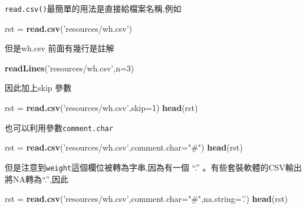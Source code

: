 \documentclass[]{book}
\newenvironment{Shaded}{\begin{snugshade}}{\end{snugshade}}
\newcommand{\DataTypeTok}[1]{\textcolor[rgb]{0.13,0.29,0.53}{#1}}
\newcommand{\DecValTok}[1]{\textcolor[rgb]{0.00,0.00,0.81}{#1}}
\newcommand{\KeywordTok}[1]{\textcolor[rgb]{0.13,0.29,0.53}{\textbf{#1}}}
\newcommand{\NormalTok}[1]{#1}
\newcommand{\StringTok}[1]{\textcolor[rgb]{0.31,0.60,0.02}{#1}}
\theoremstyle{definition}
\theoremstyle{definition}
\theoremstyle{definition}
\theoremstyle{remark}
\begin{document}
\texttt{read.csv()}最簡單的用法是直接給檔案名稱,例如

\begin{Shaded}
\begin{Highlighting}[]
\NormalTok{rst =}\StringTok{ }\KeywordTok{read.csv}\NormalTok{(}\StringTok{'resources/wh.csv'}\NormalTok{)}
\end{Highlighting}
\end{Shaded}

但是wh.csv 前面有幾行是註解

\begin{Shaded}
\begin{Highlighting}[]
\KeywordTok{readLines}\NormalTok{(}\StringTok{'resources/wh.csv'}\NormalTok{,}\DataTypeTok{n=}\DecValTok{3}\NormalTok{)}
\end{Highlighting}
\end{Shaded}

因此加上skip 參數

\begin{Shaded}
\begin{Highlighting}[]
\NormalTok{rst =}\StringTok{ }\KeywordTok{read.csv}\NormalTok{(}\StringTok{'resources/wh.csv'}\NormalTok{,}\DataTypeTok{skip=}\DecValTok{1}\NormalTok{)}
\KeywordTok{head}\NormalTok{(rst)}
\end{Highlighting}
\end{Shaded}

也可以利用參數\texttt{comment.char}

\begin{Shaded}
\begin{Highlighting}[]
\NormalTok{rst =}\StringTok{ }\KeywordTok{read.csv}\NormalTok{(}\StringTok{'resources/wh.csv'}\NormalTok{,}\DataTypeTok{comment.char=}\StringTok{"#"}\NormalTok{)}
\KeywordTok{head}\NormalTok{(rst)}
\end{Highlighting}
\end{Shaded}

但是注意到\texttt{weight}這個欄位被轉為字串,因為有一個 ``.''
。有些套裝軟體的CSV輸出將NA轉為``.'',因此

\begin{Shaded}
\begin{Highlighting}[]
\NormalTok{rst =}\StringTok{ }\KeywordTok{read.csv}\NormalTok{(}\StringTok{'resources/wh.csv'}\NormalTok{,}\DataTypeTok{comment.char=}\StringTok{"#"}\NormalTok{,}\DataTypeTok{na.string=}\StringTok{'.'}\NormalTok{)}
\KeywordTok{head}\NormalTok{(rst)}
\end{Highlighting}
\end{Shaded}
\end{document}
